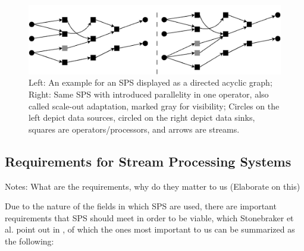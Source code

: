         \begin{figure}[h]
            \label{fig:sps_parallel_normal}
            \centering
            \includegraphics[width=1.0\textwidth]{Bilder/sps_parallel_normal.png}
            \caption{
                    Left: An example for an SPS displayed as a directed acyclic graph;
                    Right: Same SPS with introduced parallelity in one operator, also called scale-out adaptation, marked gray for visibility;
                    Circles on the left depict data sources, circled on the right depict data sinks, squares are operators/processors, and arrows are streams.
                    }
        \end{figure}


        \subsection{Requirements for Stream Processing Systems}
        \label{sub:requirements}

        Notes: What are the requirements, why do they matter to us (Elaborate on this)

        Due to the nature of the fields in which SPS are used, there are important requirements that SPS should meet in order to be viable, 
        which Stonebraker et al. point out in \cite{Stonebraker:2005:RRS:1107499.1107504}, of which the ones most important to us can be summarized as the following:
        
